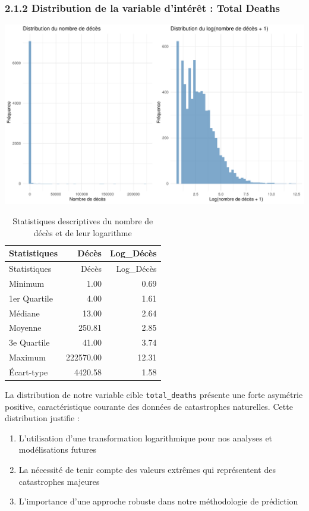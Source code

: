 \documentclass[
]{article}
\providecommand{\tightlist}{%
  \setlength{\itemsep}{0pt}\setlength{\parskip}{0pt}}
\begin{document}
\subsubsection{2.1.2 Distribution de la variable d'intérêt : Total
Deaths}\label{distribution-de-la-variable-dintuxe9ruxeat-total-deaths}

\includegraphics{Projet_ML_files/figure-latex/distribution_target-1.pdf}

\begin{longtable}[]{@{}lrr@{}}
\caption{Statistiques descriptives du nombre de décès et de leur
logarithme}\tabularnewline
\toprule\noalign{}
Statistiques & Décès & Log\_Décès \\
\midrule\noalign{}
\endfirsthead
\toprule\noalign{}
Statistiques & Décès & Log\_Décès \\
\midrule\noalign{}
\endhead
\bottomrule\noalign{}
\endlastfoot
Minimum & 1.00 & 0.69 \\
1er Quartile & 4.00 & 1.61 \\
Médiane & 13.00 & 2.64 \\
Moyenne & 250.81 & 2.85 \\
3e Quartile & 41.00 & 3.74 \\
Maximum & 222570.00 & 12.31 \\
Écart-type & 4420.58 & 1.58 \\
\end{longtable}

La distribution de notre variable cible \texttt{total\_deaths} présente
une forte asymétrie positive, caractéristique courante des données de
catastrophes naturelles. Cette distribution justifie :

\begin{enumerate}
\def\labelenumi{\arabic{enumi}.}
\tightlist
\item
  L'utilisation d'une transformation logarithmique pour nos analyses et
  modélisations futures
\item
  La nécessité de tenir compte des valeurs extrêmes qui représentent des
  catastrophes majeures
\item
  L'importance d'une approche robuste dans notre méthodologie de
  prédiction
\end{enumerate}
\end{document}
